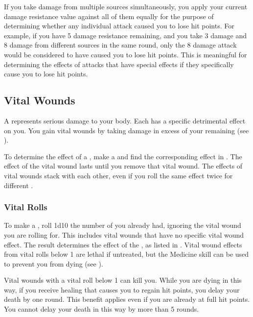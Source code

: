          If you take damage from multiple sources simultaneously, you apply your current damage resistance value against all of them equally for the purpose of determining whether any individual attack caused you to lose hit points.
        For example, if you have 5 damage resistance remaining, and you take 3 damage and 8 damage from different sources in the same round, only the 8 damage attack would be considered to have caused you to lose hit points.
        This is meaningful for determining the effects of attacks that have special effects if they specifically cause you to lose hit points.

    \subsection{Vital Wounds}\label{Vital Wounds}
        A  represents serious damage to your body.
        Each  has a specific detrimental effect on you.
        You gain vital wounds by taking damage in excess of your remaining  (see ).

        To determine the effect of a , make a  and find the corresponding effect in .
        The effect of the vital wound lasts until you remove that vital wound.
        The effects of vital wounds stack with each other, even if you roll the same effect twice for different .

        \subsubsection{Vital Rolls}\label{Vital Rolls}
            To make a , roll 1d10 \sub the number of  you already had, ignoring the vital wound you are rolling for.
            This includes vital wounds that have no specific vital wound effect.
            The result determines the effect of the , as listed in .
            Vital wound effects from vital rolls below 1 are lethal if untreated, but the Medicine skill can be used to prevent you from dying (see ).

             Vital wounds with a vital roll below 1 can kill you.
            While you are dying in this way, if you receive healing that causes you to regain hit points, you delay your death by one round.
            This benefit applies even if you are already at full hit points.
            You cannot delay your death in this way by more than 5 rounds.

